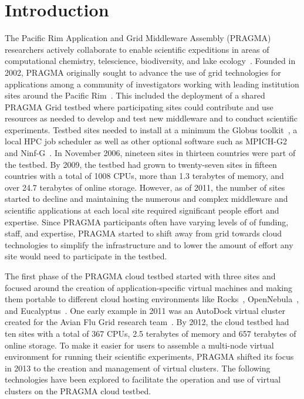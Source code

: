 \documentclass{acm_proc_article-sp}
\begin{document}



\section{Introduction}
\label{Sec:intro}

The Pacific Rim Application and Grid Middleware Assembly (PRAGMA) researchers actively collaborate to enable scientific expeditions in areas of computational chemistry, telescience, biodiversity, and lake ecology~\cite{pragmaWeb}.  Founded in 2002, PRAGMA originally sought to advance the use of grid technologies for applications among a community of investigators working with leading institution sites around the Pacific Rim~\cite{pragmaReport2004}.  This included the deployment of a shared PRAGMA Grid testbed where participating sites could contribute and use resources as needed to develop and test new middleware and to conduct scientific experiments.  Testbed sites needed to install at a minimum the Globus toolkit~\cite{globus}, a local HPC job scheduler as well as other optional software such as MPICH-G2~\cite{mpichg2} and Ninf-G~\cite{ninfg}.  In November 2006, nineteen sites in thirteen countries were part of the testbed.  By 2009, the testbed had grown to twenty-seven sites in fifteen countries with a total of 1008 CPUs, more than 1.3 terabytes of memory, and over 24.7 terabytes of online storage.  However, as of 2011, the number of sites started to decline and maintaining the numerous and complex middleware and scientific applications at each local site required significant people effort and expertise.  Since PRAGMA participants often have varying levels of of funding, staff, and expertise, PRAGMA started to shift away from grid towards cloud technologies to simplify the infrastructure and to lower the amount of effort any site would need to participate in the testbed.  

The first phase of the PRAGMA cloud testbed started with three sites and focused around the creation of application-specific virtual machines and making them portable to  different cloud hosting environments like Rocks~\cite{rocks}, OpenNebula~\cite{opennebula}, and Eucalyptus~\cite{eucalyptus}.
One early example in 2011 was an AutoDock virtual cluster created for the Avian Flu Grid research team~\cite{pragmaReport2011}.   By 2012, the cloud testbed had ten sites with a total of 367 CPUs, 2.5 terabytes of memory and 657 terabytes of online storage.  To make it easier for users to assemble a multi-node virtual environment for running their scientific experiments, PRAGMA shifted its  focus in 2013 to the creation and management of virtual clusters.  The following technologies have been explored to facilitate the operation and use of virtual clusters on the PRAGMA cloud testbed.
\end{document}
